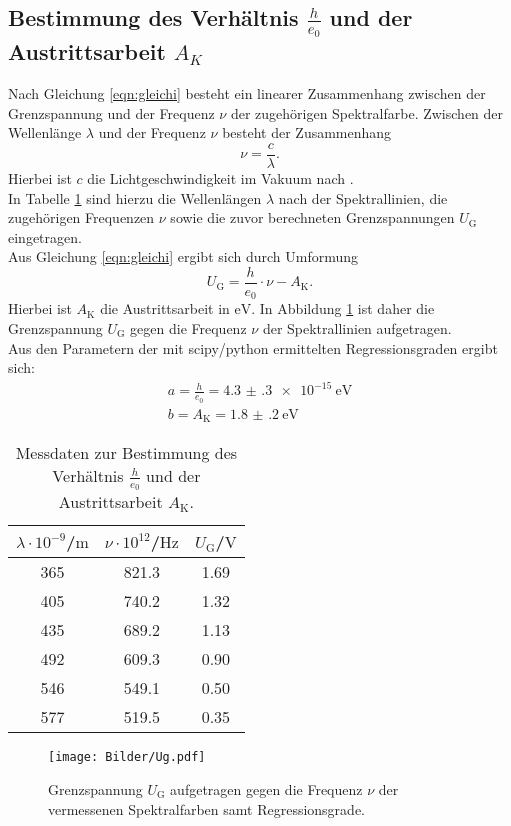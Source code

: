\subsection{Bestimmung des Verhältnis $\frac{h}{e_0}$ und der Austrittsarbeit $A_{K}$}
Nach Gleichung \eqref{eqn:gleichi} besteht ein linearer Zusammenhang zwischen der Grenzspannung und der Frequenz $\nu$ der zugehörigen Spektralfarbe.
Zwischen der Wellenlänge $\lambda$ und der Frequenz $\nu$ besteht der Zusammenhang
\begin{equation*}
  \nu=\frac{c}{\lambda} \text{.}
\end{equation*}
Hierbei ist $c$ die Lichtgeschwindigkeit im Vakuum nach \cite{c}.\\
In Tabelle \ref{tab:ak} sind hierzu die Wellenlängen $\lambda$ nach \cite{Anleitung} der Spektrallinien, die zugehörigen Frequenzen $\nu$ sowie die zuvor berechneten Grenzspannungen $U_\mathrm{G}$ eingetragen.\\
Aus Gleichung \eqref{eqn:gleichi} ergibt sich durch Umformung
\begin{equation*}
  U_\mathrm{G}=\frac{h}{e_0} \cdot{\nu}-A_\mathrm{K} \text{.}
\end{equation*}
Hierbei ist $A_\mathrm{K}$ die Austrittsarbeit in $\si{\electronvolt}$.
In Abbildung \ref{fig:ak} ist daher die Grenzspannung $U_\mathrm{G}$ gegen die Frequenz $\nu$ der Spektrallinien aufgetragen.\\
Aus den Parametern der mit scipy/python \cite{scipy} ermittelten Regressionsgraden ergibt sich:
\begin{gather*}
  a=\frac{h}{e_0}= \SI{4.3(3)e-15}{\electronvolt}\\
b=A_\mathrm{K}=\SI{1.8(2)}{\electronvolt}
\end{gather*}


\begin{table}
  \centering
\caption{Messdaten zur Bestimmung des Verhältnis $\frac{h}{e_0}$ und der Austrittsarbeit $A_\mathrm{K}$.}
\label{tab:ak}
\begin{tabular}{ccc}
  \toprule
$\lambda \cdot 10^{-9}$/$\si{\meter}$& $\nu \cdot 10^{12}$/$\si{\hertz}$ & $U_\mathrm{G}$/$\si{\volt}$ \\
\midrule
365 & 821.3 & 1.69 \\
405 & 740.2 & 1.32 \\
435 & 689.2 & 1.13 \\
492 & 609.3 & 0.90 \\
546 & 549.1 & 0.50 \\
577 & 519.5 & 0.35 \\
\bottomrule
\end{tabular}
\end{table}
\begin{figure}
  \centering
  \caption{Grenzspannung $U_\mathrm{G}$ aufgetragen gegen die Frequenz $\nu$ der vermessenen Spektralfarben samt Regressionsgrade.}
  \label{fig:ak}
  \texttt{[image: Bilder/Ug.pdf]}
\end{figure}

